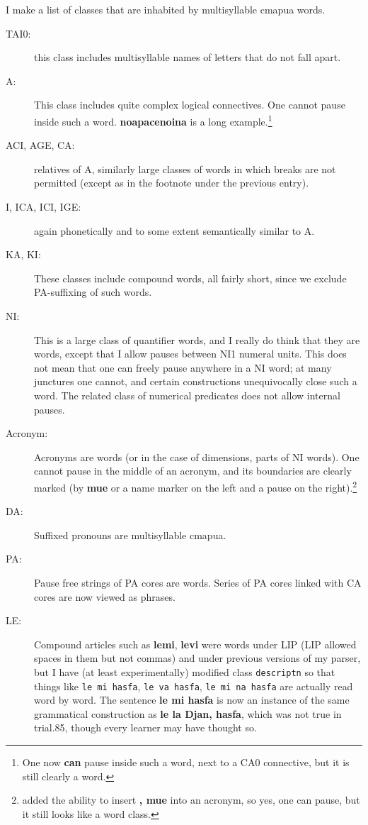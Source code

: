 \documentclass[12pt]{book}
\begin{document}
{I make a list of classes that are inhabited by multisyllable cmapua words.

\begin{description}

\item[TAI0:]  this class includes multisyllable names of letters that do not fall apart.

\item[A:]  This class includes quite complex logical connectives.  One cannot pause inside such a word.  {\bf noapacenoina} is a long example.\footnote{One now {\bf can} pause inside such a word, next to a CA0 connective, but it is still clearly a word.}

\item[ACI, AGE, CA:]  relatives of A, similarly large classes of words in which breaks are not permitted (except as in the footnote under the previous entry).

\item[I, ICA, ICI, IGE:]  again phonetically and to some extent semantically similar to A.

\item[KA, KI:]  These classes include compound words, all fairly short, since we exclude PA-suffixing of such words.

\item[NI:]  This is a large class of quantifier words, and I really do think that they are words, except that I allow pauses
between NI1  numeral units.  This does not mean that one can freely pause anywhere in a NI word; at many junctures one cannot,
and certain constructions unequivocally close such a word.  The related class of numerical predicates does not allow internal pauses.

\item[Acronym:]  Acronyms are words (or in the case of dimensions, parts of NI words).  One cannot pause in the middle of an acronym,
and its boundaries are clearly marked (by {\bf mue} or a name marker on the left and a pause on the right).\footnote{added the ability to insert {\bf , mue} into an acronym, so yes, one can pause, but it still looks like a word class.}

\item[DA:]  Suffixed pronouns are multisyllable cmapua.

\item[PA:]  Pause free strings of PA cores are words.  Series of PA cores  linked with CA cores are now viewed as phrases.

\item[LE:]  Compound articles such as {\bf lemi}, {\bf levi} were words under LIP (LIP allowed spaces in them but not commas) and under previous versions of my parser,
but I have (at least experimentally) modified class {\tt descriptn} so that things like {\tt le mi hasfa}, {\tt le va hasfa}, {\tt le mi na hasfa} are actually read word by word.
The sentence {\bf le mi hasfa} is now an instance of the same grammatical construction as {\bf le la Djan, hasfa}, which was not true in trial.85, though every learner may have thought so.


\end{description}}
\end{document}
